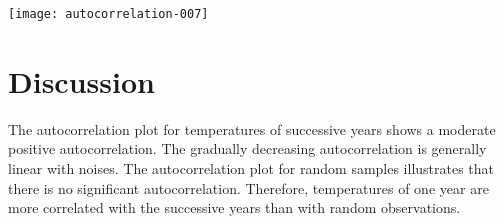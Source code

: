 \documentclass[a4paper]{article}
\begin{document}
\begin{center}
\texttt{[image: autocorrelation-007]}
\end{center}

\section{Discussion}
The autocorrelation plot for temperatures of successive years shows a moderate positive autocorrelation. The gradually decreasing autocorrelation is generally linear with noises. The autocorrelation plot for random samples illustrates that there is no significant autocorrelation. Therefore, temperatures of one year are more correlated with the successive years than with random observations.
\end{document}
